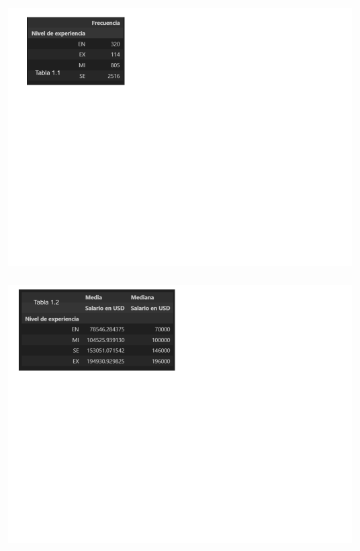\documentclass{article}
\begin{document}
	\begin{figure}[htbp]
	\begin{subfigure}[b]{1.1\textwidth}
		\includegraphics[width=\textwidth]{FigurasTablas/tabla1.1.png}
		\label{tabla 1.1}
	\end{subfigure}	

	\begin{subfigure}[b]{1.1\textwidth}
	\includegraphics[width=\textwidth]{FigurasTablas/tabla1.2.png}
		\label{tabla 1.2}
	\end{subfigure}	
	\end{figure}
\end{document}
